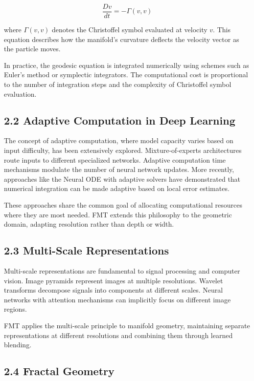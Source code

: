 \documentclass[12pt]{article}
\begin{document}
\begin{equation}
\frac{Dv}{dt} = -\Gamma(v, v)
\end{equation}

where $\Gamma(v, v)$ denotes the Christoffel symbol evaluated at velocity $v$. This equation describes how the manifold's curvature deflects the velocity vector as the particle moves.

In practice, the geodesic equation is integrated numerically using schemes such as Euler's method or symplectic integrators. The computational cost is proportional to the number of integration steps and the complexity of Christoffel symbol evaluation.

\subsection{2.2 Adaptive Computation in Deep Learning}

The concept of adaptive computation, where model capacity varies based on input difficulty, has been extensively explored. Mixture-of-experts architectures route inputs to different specialized networks. Adaptive computation time mechanisms modulate the number of neural network updates. More recently, approaches like the Neural ODE with adaptive solvers have demonstrated that numerical integration can be made adaptive based on local error estimates.

These approaches share the common goal of allocating computational resources where they are most needed. FMT extends this philosophy to the geometric domain, adapting resolution rather than depth or width.

\subsection{2.3 Multi-Scale Representations}

Multi-scale representations are fundamental to signal processing and computer vision. Image pyramids represent images at multiple resolutions. Wavelet transforms decompose signals into components at different scales. Neural networks with attention mechanisms can implicitly focus on different image regions.

FMT applies the multi-scale principle to manifold geometry, maintaining separate representations at different resolutions and combining them through learned blending.

\subsection{2.4 Fractal Geometry}
\end{document}
